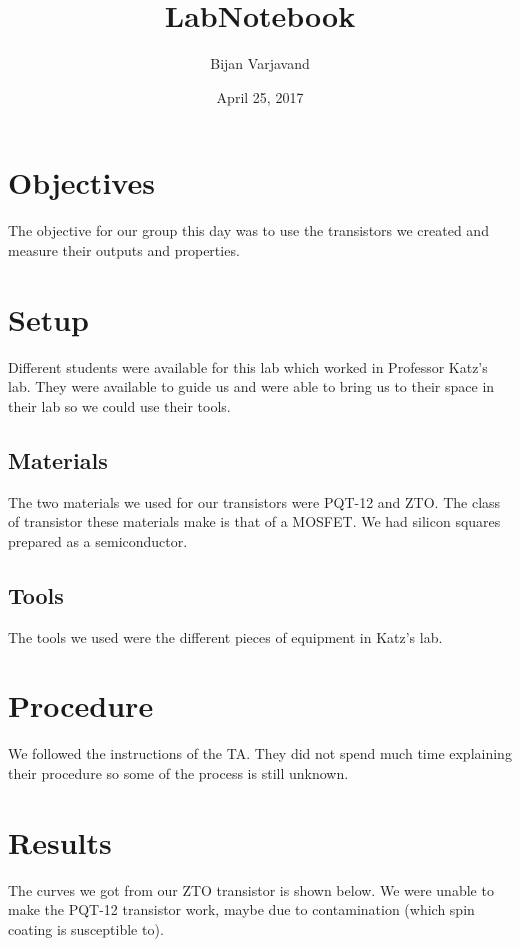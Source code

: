 \documentclass{article}
\author{Bijan Varjavand}
\title{LabNotebook}
\date{April 25, 2017}
\begin{document}
\maketitle

\section{Objectives}

The objective for our group this day was to use the transistors we created and measure their outputs and properties.

\section{Setup}

Different students were available for this lab which worked in Professor Katz's lab. They were available to guide us and were able to bring us to their space in their lab so we could use their tools.

\subsection{Materials}

The two materials we used for our transistors were PQT-12 and ZTO. The class of transistor these materials make is that of a MOSFET. We had silicon squares prepared as a semiconductor.

\subsection{Tools}

The tools we used were the different pieces of equipment in Katz's lab.

\section{Procedure}

We followed the instructions of the TA. They did not spend much time explaining their procedure so some of the process is still unknown.

\section{Results}

The curves we got from our ZTO transistor is shown below. We were unable to make the PQT-12 transistor work, maybe due to contamination (which spin coating is susceptible to).
\end{document}
